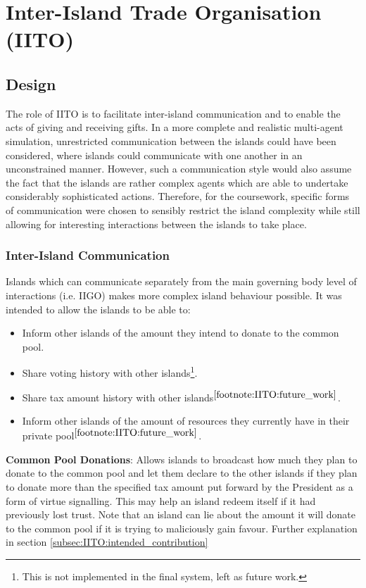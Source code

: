 \chapter{Inter-Island Trade Organisation (IITO)}

\section{Design}
\label{sec:IITO:Design}

The role of IITO is to facilitate inter-island communication and to enable the acts of giving and receiving gifts. In a more complete and realistic multi-agent simulation, unrestricted communication between the islands could have been considered, where islands could communicate with one another in an unconstrained manner. However, such a communication style would also assume the fact that the islands are rather complex agents which are able to undertake considerably sophisticated actions. Therefore, for the coursework, specific forms of communication were chosen to sensibly restrict the island complexity while still allowing for interesting interactions between the islands to take place.

\subsection{Inter-Island Communication}  
\label{subsec:IITO:inter_island_communication}

Islands which can communicate separately from the main governing body level of interactions (i.e. IIGO) makes more complex island behaviour possible. It was intended to allow the islands to be able to:

\begin{itemize}
    \item Inform other islands of the amount they intend to donate to the common pool.
    \item Share voting history with other islands\footnote{\label{footnote:IITO:future_work}This is not implemented in the final system, left as future work.}.
    \item Share tax amount history with other islands$^{\ref{footnote:IITO:future_work}}$.
    \item Inform other islands of the amount of resources they currently have in their private pool$^{\ref{footnote:IITO:future_work}}$.
\end{itemize}


\textbf{Common Pool Donations}: Allows islands to broadcast how much they plan to donate to the common pool and let them declare to the other islands if they plan to donate more than the specified tax amount put forward by the President as a form of virtue signalling. This may help an island redeem itself if it had previously lost trust. Note that an island can lie about the amount it will donate to the common pool if it is trying to maliciously gain favour. Further explanation in section \ref{subsec:IITO:intended_contribution}

